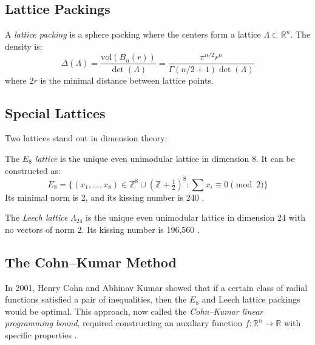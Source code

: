\subsection{Lattice Packings}

\begin{definition}
A \emph{lattice packing} is a sphere packing where the centers form a lattice $\Lambda \subset \mathbb{R}^n$. The density is:
\begin{equation}
\Delta(\Lambda) = \frac{\text{vol}(B_n(r))}{\det(\Lambda)} = \frac{\pi^{n/2} r^n}{\Gamma(n/2 + 1) \det(\Lambda)}
\end{equation}
where $2r$ is the minimal distance between lattice points.
\end{definition}

\subsection{Special Lattices}

Two lattices stand out in dimension theory:

\begin{definition}[$E_8$ Lattice]
The \emph{$E_8$ lattice} is the unique even unimodular lattice in dimension 8. It can be constructed as:
\begin{equation}
E_8 = \{(x_1, \ldots, x_8) \in \mathbb{Z}^8 \cup (\mathbb{Z} + \tfrac{1}{2})^8 : \sum x_i \equiv 0 \pmod{2}\}
\end{equation}
Its minimal norm is 2, and its kissing number is 240 \cite{conway1999}.
\end{definition}

\begin{definition}
The \emph{Leech lattice} $\Lambda_{24}$ is the unique even unimodular lattice in dimension 24 with no vectors of norm 2. Its kissing number is 196,560 \cite{conway1999}.
\end{definition}

\subsection{The Cohn--Kumar Method}

In 2001, Henry Cohn and Abhinav Kumar showed that if a certain class of radial functions satisfied a pair of inequalities, then the $E_8$ and Leech lattice packings would be optimal. This approach, now called the \emph{Cohn--Kumar linear programming bound}, required constructing an auxiliary function $f: \mathbb{R}^n \to \mathbb{R}$ with specific properties \cite{cohn2003}.

